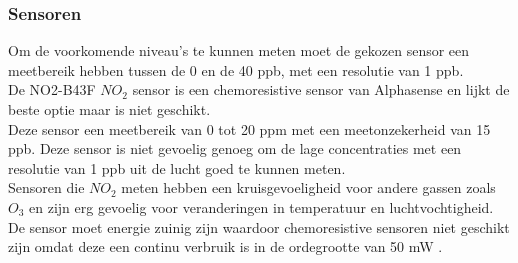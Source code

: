 \documentclass[a4paper, 11pt]{article} %
\begin{document}
\newpage
\subsubsection{Sensoren}
Om de voorkomende niveau's te kunnen meten moet de gekozen sensor een meetbereik hebben tussen de 0 en de 40 ppb, met een resolutie van 1 ppb.\\
De NO2-B43F $NO_2$ sensor is een chemoresistive sensor van Alphasense en lijkt de beste optie maar is niet geschikt.\\
Deze sensor een meetbereik van 0 tot 20 ppm met een meetonzekerheid van 15 ppb. Deze sensor is niet gevoelig genoeg om de lage concentraties met een resolutie van 1 ppb uit de lucht goed te kunnen meten.\\ 
Sensoren die $NO_2$ meten hebben een kruisgevoeligheid voor andere gassen zoals $O_3$ en zijn erg gevoelig voor veranderingen in temperatuur en luchtvochtigheid. \\
De sensor moet energie zuinig zijn waardoor chemoresistive sensoren niet geschikt zijn omdat deze een continu verbruik is in de ordegrootte van 50 mW \cite{B4DF}. 
\end{document}

